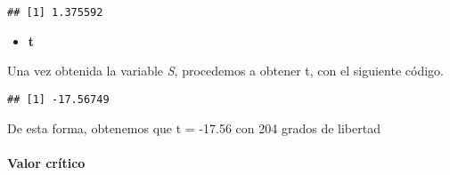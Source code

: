 \documentclass[
]{article}
\newenvironment{Shaded}{\begin{snugshade}}{\end{snugshade}}
\newcommand{\CommentTok}[1]{\textcolor[rgb]{0.56,0.35,0.01}{\textit{#1}}}
\newcommand{\ControlFlowTok}[1]{\textcolor[rgb]{0.13,0.29,0.53}{\textbf{#1}}}
\newcommand{\DecValTok}[1]{\textcolor[rgb]{0.00,0.00,0.81}{#1}}
\newcommand{\KeywordTok}[1]{\textcolor[rgb]{0.13,0.29,0.53}{\textbf{#1}}}
\newcommand{\NormalTok}[1]{#1}
\newcommand{\OperatorTok}[1]{\textcolor[rgb]{0.81,0.36,0.00}{\textbf{#1}}}
\newcommand{\StringTok}[1]{\textcolor[rgb]{0.31,0.60,0.02}{#1}}
\providecommand{\tightlist}{%
  \setlength{\itemsep}{0pt}\setlength{\parskip}{0pt}}
\begin{document}
\begin{Shaded}
\end{Shaded}

\begin{verbatim}
## [1] 1.375592
\end{verbatim}

\begin{itemize}
\tightlist
\item
  \textbf{t}
\end{itemize}

Una vez obtenida la variable \emph{S}, procedemos a obtener t, con el
siguiente código.

\begin{Shaded}
\end{Shaded}

\begin{verbatim}
## [1] -17.56749
\end{verbatim}

De esta forma, obtenemos que t = -17.56 con 204 grados de libertad

\hypertarget{valor-cruxedtico}{%
\paragraph{Valor crítico}\label{valor-cruxedtico}}
\end{document}
